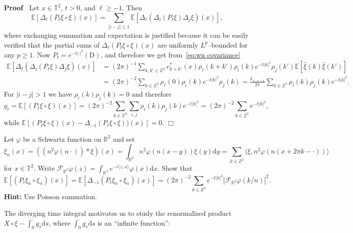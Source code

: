 \documentclass[a4paper,11pt]{article}
\newcommand{\cdummy}{\cdot}
\newcommand{\mathD}{\mathrm{D}}
\newcommand{\mathd}{\mathrm{d}}
\newcommand{\tmtextbf}[1]{{\bfseries{#1}}}
\newenvironment{proof}{\noindent\textbf{Proof\ }}{\hspace*{\fill}$\Box$\medskip}
\newcommand{\CF}{\mathscr{F}}
\newcommand{\reso}{\,\mathord{\circ}\,}
\begin{document}
\begin{proof}
  Let $x \in \mathbb{T}^2$, $t > 0$, and $\ell \ge - 1$. Then
  \[ \mathbb{E} [\Delta_{\ell} (P_t \xi \reso \xi) (x)] = \sum_{|i - j|
     \leqslant 1} \mathbb{E} [\Delta_{\ell} (\Delta_i (P_t \xi) \Delta_j \xi)
     (x)], \]
  where exchanging summation and expectation is justified because it can be
  easily verified that the partial sums of $\Delta_{\ell}  (P_t \xi \reso \xi)
  (x)$ are uniformly $L^p$--bounded for any $p \ge 1$. Now $P_t = e^{- t
  \lvert \cdummy \rvert^2} (\mathD)$, and therefore we get from~\eqref{eq:wn
  covariance}
  \begin{align*}
    \mathbb{E} [\Delta_{\ell} (\Delta_i (P_t \xi) \Delta_j \xi) (x)] &= (2 \pi)^{- 1}  \sum_{k, k' \in \mathbb{Z}^2} e_{k +    k'}^{\ast} (x) \rho_{\ell}  (k + k') \rho_i (k) e^{- t |k|^2} \rho_j (k') \mathbb{E} [\hat{\xi} (k) \hat{\xi} (k')] \\
    & = (2 \pi)^{- 2} \sum_{k \in \mathbb{Z}^2} \rho_{\ell} (0)
    \rho_i (k) e^{- t |k|^2} \rho_j (k) = \frac{\delta_{\ell = - 1}}{2 \pi} 
    \sum_{k \in \mathbb{Z}^2} \rho_i (k) \rho_j (k) e^{- t |k|^2} . & 
  \end{align*}
  For $|i - j| > 1$ we have $\rho_i (k) \rho_j (k) = 0$ and therefore
  \[ g_t =\mathbb{E} [(P_t \xi \reso \xi) (x)] = (2 \pi)^{- 2} \sum_{k \in
     \mathbb{Z}^2} \sum_{i, j} \rho_i (k) \rho_j (k) e^{- t |k|^2} = (2
     \pi)^{- 2} \sum_{k \in \mathbb{Z}^2} e^{- t |k|^2}, \]
  while $\mathbb{E} [(P_t \xi \reso \xi) (x) - \Delta_{- 1} (P_t \xi \reso
  \xi)) (x)] = 0$.
\end{proof}

\begin{exercise}
  Let $\varphi$ be a Schwartz function on $\mathbb{R}^2$ and set
  \[ \xi_n (x) = ((n^2 \varphi (n \cdot)) \ast \xi) (x) = \int_{\mathbb{R}^2}
     n^2 \varphi (n (x - y)) \xi (y) \mathd y = \sum_{k \in \mathbb{Z}^2}
     \langle \xi, n^2 \varphi (n (x + 2 \pi k - \cdummy)) \rangle \]
  for $x \in \mathbb{T}^2$. Write $\CF_{\mathbb{R}^2} \varphi (z) =
  \int_{\mathbb{R}^2} e^{- i \langle z, x \rangle} \varphi (x) \mathd x$.
  Show that
  \[ \mathbb{E} [(P_t \xi_n \reso \xi_n) (x)] =\mathbb{E} [\Delta_{- 1} (P_t
     \xi_n \reso \xi_n) (x)] = (2 \pi)^{- 2} \sum_{k \in \mathbb{Z}^2} e^{- t
     |k|^2}  | \CF_{\mathbb{R}^2} \varphi (k / n) |^2 . \]
  \tmtextbf{Hint:} Use Poisson summation.
\end{exercise}

The diverging time integral motivates us to study the renormalized product $X
\reso \xi - \int_0^{\cdot} g_s \mathd s$, where $\int_0^{\cdot} g_s \mathd s$
is an ``infinite function'':
\end{document}
